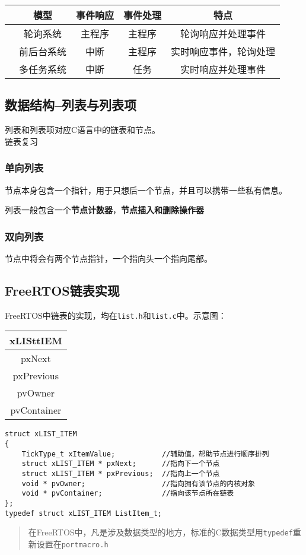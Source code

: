 \documentclass[11pt,a4paper]{ctexart}
\begin{document}
\begin{center}
	\begin{tabular}{|c|c|c|c|c|}
		\hline
		& 模型 & 事件响应 & 事件处理 & 特点 \\ \hline
		& 轮询系统 & 主程序 & 主程序 & 轮询响应并处理事件 \\ \hline
		& 前后台系统 & 中断 & 主程序 & 实时响应事件，轮询处理 \\ \hline
		& 多任务系统 & 中断 & 任务 & 实时响应并处理事件 \\ \hline
	\end{tabular}
\end{center}

\subsection{数据结构--列表与列表项}
\textcolor{myblue}{列表和列表项}对应C语言中的链表和节点。
~\\
\textcolor{myred}{链表复习}
\subsubsection{单向列表}
节点本身包含一个指针，用于只想后一个节点，并且可以携带一些私有信息。

列表一般包含一个\textbf{节点计数器}，\textbf{节点插入和删除操作器}
\subsubsection{双向列表}
节点中将会有两个节点指针，一个指向头一个指向尾部。

\subsection{FreeRTOS链表实现}
FreeRTOS中链表的实现，均在\colorbox{mygrey}{\color{myred}\lstinline|list.h|}和\colorbox{mygrey}{\color{myred}\lstinline|list.c|}中。示意图：
\begin{center}
	\begin{tabular}{|c|}
		\hline
		xLISt\textunderscore tIEM \\ \hline
		pxNext \\ \hline
		pxPrevious \\ \hline
		pvOwner \\ \hline
		pvContainer \\ \hline
	\end{tabular}
\end{center}

\begin{lstlisting}
struct xLIST_ITEM
{
	TickType_t xItemValue;           //辅助值，帮助节点进行顺序排列
	struct xLIST_ITEM * pxNext;      //指向下一个节点
	struct xLIST_ITEM * pxPrevious;  //指向上一个节点
	void * pvOwner;                  //指向拥有该节点的内核对象
	void * pvContainer;              //指向该节点所在链表
};
typedef struct xLIST_ITEM ListItem_t;
\end{lstlisting}
\begin{quote}
	在FreeRTOS中，凡是涉及数据类型的地方，标准的C数据类型用{\color{myred}\lstinline|typedef|}重新设置在{\color{myred}\lstinline|portmacro.h|}
\end{quote}
\end{document}
